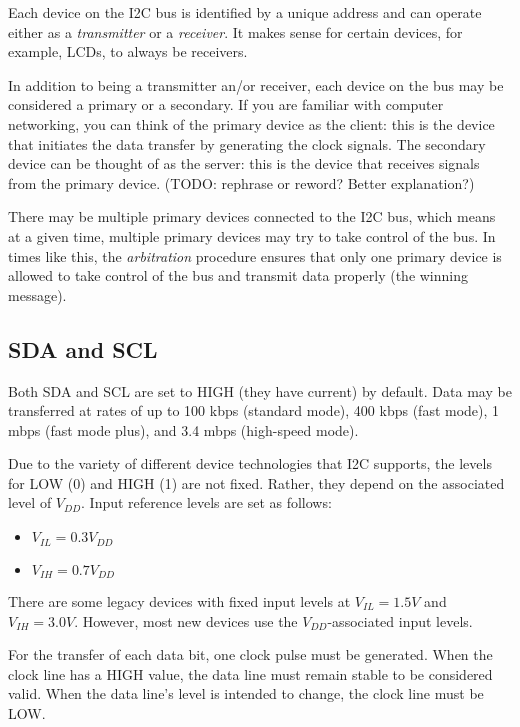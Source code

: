 \documentclass[a4paper,12pt,twoside]{report}
\begin{document}
                Each device on the I2C bus is identified by a unique address and can operate either as a \textit{transmitter} or a \textit{receiver}. It makes sense for certain devices, for example, LCDs, to always be receivers.

                In addition to being a transmitter an/or receiver, each device on the bus may be considered a primary or a secondary. If you are familiar with computer networking, you can think of the primary device as the client: this is the device that initiates the data transfer by generating the clock signals. The secondary device can be thought of as the server: this is the device that receives signals from the primary device. (TODO: rephrase or reword? Better explanation?)

                There may be multiple primary devices connected to the I2C bus, which means at a given time, multiple primary devices may try to take control of the bus. In times like this, the \textit{arbitration} procedure ensures that only one primary device is allowed to take control of the bus and transmit data properly (the winning message).

                \subsection{SDA and SCL}
                    Both SDA and SCL are set to HIGH (they have current) by default. Data may be transferred at rates of up to 100 kbps (standard mode), 400 kbps (fast mode), 1 mbps (fast mode plus), and 3.4 mbps (high-speed mode).

                    Due to the variety of different device technologies that I2C supports, the levels for LOW (0) and HIGH (1) are not fixed. Rather, they depend on the associated level of $V_{DD}$. Input reference levels are set as follows:
                    \begin{itemize}
                        \item $V_{IL} = 0.3 V_{DD}$
                        \item $V_{IH} = 0.7 V_{DD}$
                    \end{itemize}

                    There are some legacy devices with fixed input levels at $V_{IL} = 1.5V$ and $V_{IH} = 3.0V$. However, most new devices use the $V_{DD}$-associated input levels.

                    For the transfer of each data bit, one clock pulse must be generated. When the clock line has a HIGH value, the data line must remain stable to be considered valid. When the data line's level is intended to change, the clock line must be LOW.
\end{document}
